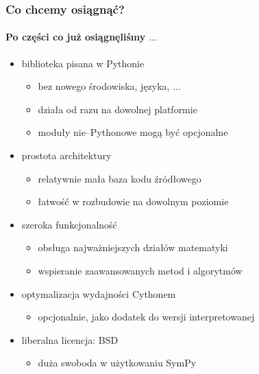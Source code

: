 \documentclass{beamer}
\begin{document}
\begin{frame}
    \frametitle{Co chcemy osiągnąć?}
    \framesubtitle{Po części co już osiągnęliśmy $\ldots$}

    \begin{itemize}
        \item biblioteka pisana w Pythonie
            \begin{itemize}
                \item bez nowego środowiska, języka, $\ldots$
                \item działa od razu na dowolnej platformie
                \item moduły nie--Pythonowe mogą być opcjonalne
            \end{itemize}
            \pause
        \item prostota architektury
            \begin{itemize}
                \item relatywnie mała baza kodu źródłowego
                \item łatwość w rozbudowie na dowolnym poziomie
            \end{itemize}
            \pause
        \item szeroka funkcjonalność
            \begin{itemize}
                \item obsługa najważniejszych działów matematyki
                \item wspieranie zaawansowanych metod i algorytmów
            \end{itemize}
            \pause
        \item optymalizacja wydajności Cythonem
            \begin{itemize}
                \item opcjonalnie, jako dodatek do wersji interpretowanej
            \end{itemize}
            \pause
        \item liberalna licencja: BSD
            \begin{itemize}
                \item duża swoboda w użytkowaniu SymPy
            \end{itemize}
    \end{itemize}
\end{frame}
\end{document}
